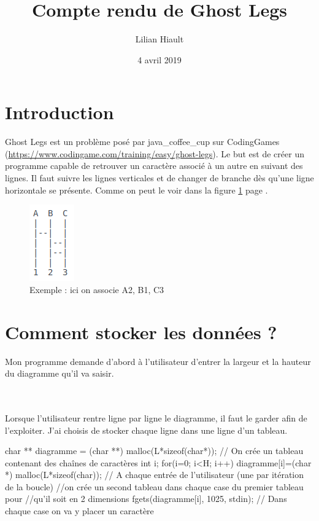 \documentclass{article}
\title{Compte rendu de \og Ghost Legs\fg{}}
\author{Lilian Hiault}
\date{4 avril 2019}
\begin{document}
\maketitle

\tableofcontents

\section*{Introduction}
\og Ghost Legs\fg{} est un problème posé par java\_coffee\_cup sur CodingGames (\url{https://www.codingame.com/training/easy/ghost-legs}). Le but est de créer un programme capable de retrouver un caractère associé à un autre en suivant des lignes. Il faut suivre les lignes verticales et de changer de branche dès qu'une ligne horizontale se présente. Comme on peut le voir dans la figure \ref{exGhostLegs} page \pageref{exGhostLegs}.

\begin{figure}[h]
  \centerline{\includegraphics{ex_ghost_legs.png}}
  \caption{Exemple : ici on associe A2, B1, C3}\label{exGhostLegs}
\end{figure}

\section{Comment stocker les données ?}

Mon programme demande d'abord à l'utilisateur d'entrer la largeur et la hauteur du diagramme qu'il va saisir.

\begin{boxedverbatim}
int main()
{
    int L = 0;
    int H = 0;
    //Entrée de la largeur et de la hauteur
    scanf("%
    fgetc(stdin);
\end{boxedverbatim}
    
\\ \\Lorsque l'utilisateur rentre ligne par ligne le diagramme, il faut le garder afin de l'exploiter. J'ai choisis de stocker chaque ligne dans une ligne d'un tableau.
\\

\begin{boxedverbatim}
  char ** diagramme = (char **) malloc(L*sizeof(char*));
  // On crée un tableau contenant des chaînes de caractères
    int i;
    for(i=0; i<H; i++)
    {
      diagramme[i]=(char *) malloc(L*sizeof(char));
      // A chaque entrée de l'utilisateur (une par itération de la boucle)
      //on crée un second tableau dans chaque case du premier tableau pour
      //qu'il soit en 2 dimensions
      fgets(diagramme[i], 1025, stdin);
      // Dans chaque case on va y placer un caractère
    }
\end{boxedverbatim}
\end{document}
